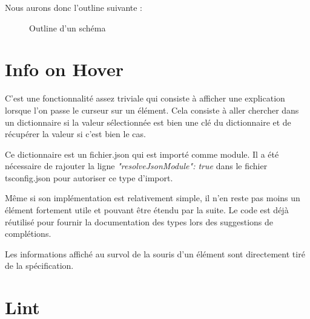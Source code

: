 \documentclass[
    iict, %
    il, %
]{heig-tb}
\begin{document}
Nous aurons donc l'outline suivante :

\begin{figure}[!h]
    \begin{center}
    \end{center}
    \caption[Outline d'un schéma]{\label{uon-schema-outline} Outline d'un schéma}
\end{figure}

\section{Info on Hover}

C'est une fonctionnalité assez triviale qui consiste à afficher une explication lorsque l'on passe le curseur sur un élément.
Cela consiste à aller chercher dans un dictionnaire si la valeur sélectionnée est bien une clé du dictionnaire et de récupérer la valeur si c'est bien le cas.

Ce dictionnaire est un fichier.json qui est importé comme module. Il a été nécessaire de rajouter la ligne \emph{"resolveJsonModule": true} dans le fichier tsconfig.json pour autoriser ce type d'import.

Même si son implémentation est relativement simple, il n'en reste pas moins un élément fortement utile et pouvant être étendu par la suite.
Le code est déjà réutilisé pour fournir la documentation des types lors des suggestions de complétions.

Les informations affiché au survol de la souris d'un élément sont directement tiré de la spécification.

\section{Lint}
\end{document}
